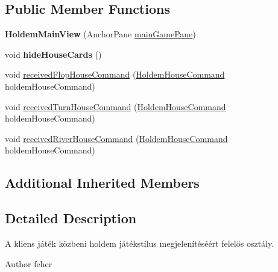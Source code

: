 \subsection*{Public Member Functions}
\begin{DoxyCompactItemize}
\item 
\hypertarget{classhu_1_1elte_1_1bfw1p6_1_1poker_1_1client_1_1view_1_1_holdem_main_view_ae3158bd9c5edd6fd8fa5d927e78b4420}{}{\bfseries Holdem\+Main\+View} (Anchor\+Pane \hyperlink{classhu_1_1elte_1_1bfw1p6_1_1poker_1_1client_1_1view_1_1_abstract_main_view_ad9a49e46e49fe5dfb4c4847e961b31cf}{main\+Game\+Pane})\label{classhu_1_1elte_1_1bfw1p6_1_1poker_1_1client_1_1view_1_1_holdem_main_view_ae3158bd9c5edd6fd8fa5d927e78b4420}

\item 
\hypertarget{classhu_1_1elte_1_1bfw1p6_1_1poker_1_1client_1_1view_1_1_holdem_main_view_ad600a460b89e38c1371d5138469cf412}{}void {\bfseries hide\+House\+Cards} ()\label{classhu_1_1elte_1_1bfw1p6_1_1poker_1_1client_1_1view_1_1_holdem_main_view_ad600a460b89e38c1371d5138469cf412}

\item 
void \hyperlink{classhu_1_1elte_1_1bfw1p6_1_1poker_1_1client_1_1view_1_1_holdem_main_view_a73ce77eb6d02427b37c9149d2a75d600}{received\+Flop\+House\+Command} (\hyperlink{classhu_1_1elte_1_1bfw1p6_1_1poker_1_1command_1_1holdem_1_1_holdem_house_command}{Holdem\+House\+Command} holdem\+House\+Command)
\item 
void \hyperlink{classhu_1_1elte_1_1bfw1p6_1_1poker_1_1client_1_1view_1_1_holdem_main_view_aa9d6d2d21facb44542d876e1ec5ec388}{received\+Turn\+House\+Command} (\hyperlink{classhu_1_1elte_1_1bfw1p6_1_1poker_1_1command_1_1holdem_1_1_holdem_house_command}{Holdem\+House\+Command} holdem\+House\+Command)
\item 
void \hyperlink{classhu_1_1elte_1_1bfw1p6_1_1poker_1_1client_1_1view_1_1_holdem_main_view_ab80337e17df79701046ac114c56482f5}{received\+River\+House\+Command} (\hyperlink{classhu_1_1elte_1_1bfw1p6_1_1poker_1_1command_1_1holdem_1_1_holdem_house_command}{Holdem\+House\+Command} holdem\+House\+Command)
\end{DoxyCompactItemize}
\subsection*{Additional Inherited Members}


\subsection{Detailed Description}
A kliens játék közbeni holdem játékstílus megjelenítéséért felelős osztály. \begin{DoxyAuthor}{Author}
feher 
\end{DoxyAuthor}


